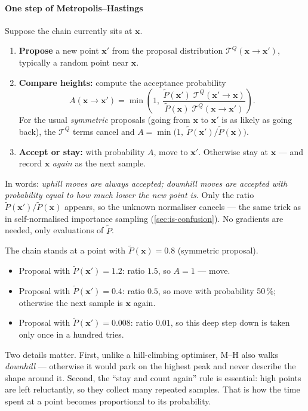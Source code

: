 \documentclass[11pt, oneside]{book}
\newcommand{\bx}{\mathbf{x}}  \newcommand{\by}{\mathbf{y}}
\begin{document}
\paragraph{One step of Metropolis--Hastings} Suppose the chain currently sits at
$\bx$.
\begin{enumerate}
  \item \textbf{Propose} a new point $\bx'$ from the proposal distribution
    $\mathcal{T}^Q(\bx \to \bx')$, typically a random point near $\bx$.
  \item \textbf{Compare heights:} compute the acceptance probability
    \[
    A(\bx \to \bx') = \min\!\left(1,\ \frac{\tilde P(\bx')\; \mathcal{T}^Q(\bx' \to \bx)}{\tilde P(\bx)\; \mathcal{T}^Q(\bx \to \bx')}\right).
    \]
    For the usual \emph{symmetric} proposals (going from $\bx$ to $\bx'$ is as
    likely as going back), the $\mathcal{T}^Q$ terms cancel and
    $A = \min\big(1,\ \tilde P(\bx')/\tilde P(\bx)\big)$.
  \item \textbf{Accept or stay:} with probability $A$, move to $\bx'$.
    Otherwise stay at $\bx$ --- and record $\bx$ \emph{again} as the next
    sample.
\end{enumerate}
In words: \emph{uphill moves are always accepted; downhill moves are accepted
with probability equal to how much lower the new point is.} Only the ratio
$\tilde P(\bx')/\tilde P(\bx)$ appears, so the unknown normaliser cancels ---
the same trick as in self-normalised importance sampling
(\cref{sec:is-confusion}). No gradients are needed, only evaluations of
$\tilde P$.

\begin{exbox}[title={Three proposals from the same point}]
The chain stands at a point with $\tilde P(\bx) = 0.8$ (symmetric proposal).
\begin{itemize}
  \item Proposal with $\tilde P(\bx') = 1.2$: ratio $1.5$, so $A = 1$ --- move.
  \item Proposal with $\tilde P(\bx') = 0.4$: ratio $0.5$, so move with
    probability 50\,\%; otherwise the next sample is $\bx$ again.
  \item Proposal with $\tilde P(\bx') = 0.008$: ratio $0.01$, so this deep
    step down is taken only once in a hundred tries.
\end{itemize}
\end{exbox}

Two details matter. First, unlike a hill-climbing optimiser, M--H also
walks \emph{downhill} --- otherwise it would park on the highest peak and
never describe the shape around it. Second, the ``stay and count again'' rule
is essential: high points are left reluctantly, so they collect many repeated
samples. That is how the time spent at a point becomes proportional to its
probability.
\end{document}
